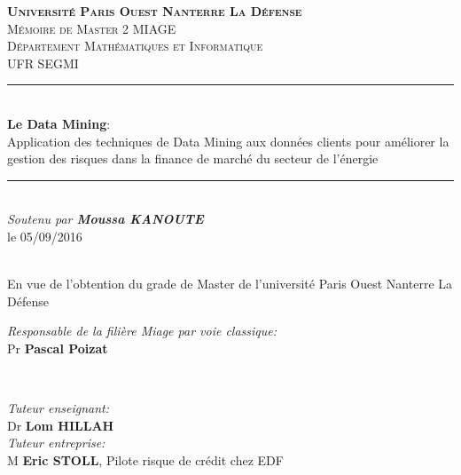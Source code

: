 \documentclass[11pt,a4paper]{report}
\begin{document}
\linespread{0.99}

\date{05 Septembre 2016}
\newcommand{\mydate}{\formatdate{4}{7}{2016}}

\begin{titlepage}
\newcommand{\HRule}{\rule{\linewidth}{0.5mm}}
\centering

\textsc{\large \textbf{Université Paris Ouest Nanterre La Défense}}\\[1.5cm] %

%
%
%
\textsc{\large Mémoire de Master 2 MIAGE}\\[0.5cm] %
\textsc{\large Département Mathématiques et Informatique}\\[0.5cm] %
\textsc{\large UFR SEGMI}\\[0.5cm] 
\HRule \\[0.4cm]
{ \large  \textbf{Le Data Mining}:\\ Application des techniques de Data Mining aux données clients pour améliorer la gestion des risques  dans la finance de marché du secteur de l'énergie}\\[0.4cm] %
\HRule \\[1cm]
\emph{Soutenu par \textbf{Moussa KANOUTE}}\\ le 05/09/2016\date{04 Juillet 2016}\\[1cm]
\large En vue de l'obtention du grade de Master de l'université Paris Ouest Nanterre La Défense
\\[1cm]
\begin{minipage}{0.4\textwidth}
\begin{flushleft} \large
\emph{Responsable de la filière Miage par voie classique:} \\
Pr \textbf{Pascal Poizat} %

\end{flushleft}
\end{minipage}
~
\begin{minipage}{0.4\textwidth}
\begin{flushright} \large
\emph{Tuteur enseignant:}\\
Dr \textbf{Lom HILLAH}\\
\emph{Tuteur entreprise:}\\
M \textbf{Eric STOLL}, Pilote risque de crédit chez EDF
\end{flushright}
\end{minipage}\\[2cm]
\date{05 Septembre 2016}


\end{titlepage}
\end{document}
